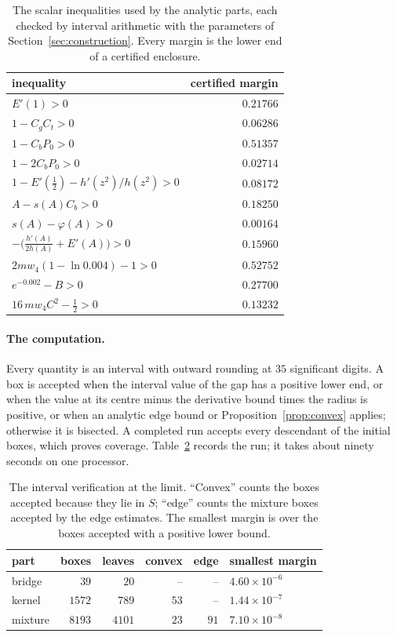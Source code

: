 \documentclass[12pt]{article}
\theoremstyle{plain}
\begin{document}
\begin{table}[htbp]
\centering
\caption{The scalar inequalities used by the analytic parts, each checked by interval arithmetic with the parameters of Section~\ref{sec:construction}. Every margin is the lower end of a certified enclosure.}
\label{tab:scalars}
\begin{tabular}{lr}
\toprule
inequality & certified margin\\
\midrule
$E'(1)>0$ & $0.21766$\\
$1-C_gC_t>0$ & $0.06286$\\
$1-C_bP_0>0$ & $0.51357$\\
$1-2C_bP_0>0$ & $0.02714$\\
$1-E'(\frac12)-h'(z^2)/h(z^2)>0$ & $0.08172$\\
$A-s(A)C_b>0$ & $0.18250$\\
$s(A)-\varphi(A)>0$ & $0.00164$\\
$-\bigl(\frac{h'(A)}{2h(A)}+E'(A)\bigr)>0$ & $0.15960$\\
$2mw_4(1-\ln 0.004)-1>0$ & $0.52752$\\
$e^{-0.002}-B>0$ & $0.27700$\\
$16\,mw_4C^2-\frac12>0$ & $0.13232$\\
\bottomrule
\end{tabular}
\end{table}

\paragraph*{The computation.} Every quantity is an interval with outward rounding at $35$ significant digits. A box is accepted when the interval value of the gap has a positive lower end, or when the value at its centre minus the derivative bound times the radius is positive, or when an analytic edge bound or Proposition~\ref{prop:convex} applies; otherwise it is bisected. A completed run accepts every descendant of the initial boxes, which proves coverage. Table~\ref{tab:run} records the run; it takes about ninety seconds on one processor.

\begin{table}[htbp]
\centering
\caption{The interval verification at the limit. ``Convex'' counts the boxes accepted because they lie in $S$; ``edge'' counts the mixture boxes accepted by the edge estimates. The smallest margin is over the boxes accepted with a positive lower bound.}
\label{tab:run}
\begin{tabular}{lrrrrl}
\toprule
part & boxes & leaves & convex & edge & smallest margin\\
\midrule
bridge & $39$ & $20$ & -- & -- & $4.60\times10^{-6}$\\
kernel & $1572$ & $789$ & $53$ & -- & $1.44\times10^{-7}$\\
mixture & $8193$ & $4101$ & $23$ & $91$ & $7.10\times10^{-8}$\\
\bottomrule
\end{tabular}
\end{table}
\end{document}

